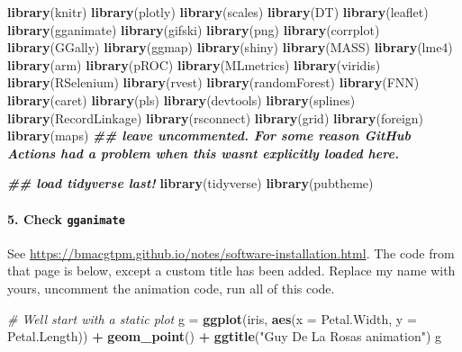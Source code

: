 \documentclass[
]{article}
\newenvironment{Shaded}{\begin{snugshade}}{\end{snugshade}}
\newcommand{\AttributeTok}[1]{\textcolor[rgb]{0.13,0.29,0.53}{#1}}
\newcommand{\CommentTok}[1]{\textcolor[rgb]{0.56,0.35,0.01}{\textit{#1}}}
\newcommand{\DocumentationTok}[1]{\textcolor[rgb]{0.56,0.35,0.01}{\textbf{\textit{#1}}}}
\newcommand{\FunctionTok}[1]{\textcolor[rgb]{0.13,0.29,0.53}{\textbf{#1}}}
\newcommand{\NormalTok}[1]{#1}
\newcommand{\OtherTok}[1]{\textcolor[rgb]{0.56,0.35,0.01}{#1}}
\newcommand{\SpecialCharTok}[1]{\textcolor[rgb]{0.81,0.36,0.00}{\textbf{#1}}}
\newcommand{\StringTok}[1]{\textcolor[rgb]{0.31,0.60,0.02}{#1}}
\begin{document}
\begin{Shaded}
\begin{Highlighting}[]
\FunctionTok{library}\NormalTok{(knitr)}
\FunctionTok{library}\NormalTok{(plotly)}
\FunctionTok{library}\NormalTok{(scales)}
\FunctionTok{library}\NormalTok{(DT)}
\FunctionTok{library}\NormalTok{(leaflet)}
\FunctionTok{library}\NormalTok{(gganimate)}
\FunctionTok{library}\NormalTok{(gifski)}
\FunctionTok{library}\NormalTok{(png)}
\FunctionTok{library}\NormalTok{(corrplot)}
\FunctionTok{library}\NormalTok{(GGally)}
\FunctionTok{library}\NormalTok{(ggmap)}
\FunctionTok{library}\NormalTok{(shiny)}
\FunctionTok{library}\NormalTok{(MASS)}
\FunctionTok{library}\NormalTok{(lme4)}
\FunctionTok{library}\NormalTok{(arm)}
\FunctionTok{library}\NormalTok{(pROC)}
\FunctionTok{library}\NormalTok{(MLmetrics)}
\FunctionTok{library}\NormalTok{(viridis)}
\FunctionTok{library}\NormalTok{(RSelenium)}
\FunctionTok{library}\NormalTok{(rvest)}
\FunctionTok{library}\NormalTok{(randomForest)}
\FunctionTok{library}\NormalTok{(FNN)}
\FunctionTok{library}\NormalTok{(caret)}
\FunctionTok{library}\NormalTok{(pls)}
\FunctionTok{library}\NormalTok{(devtools)}
\FunctionTok{library}\NormalTok{(splines)}
\FunctionTok{library}\NormalTok{(RecordLinkage)}
\FunctionTok{library}\NormalTok{(rsconnect)}
\FunctionTok{library}\NormalTok{(grid)}
\FunctionTok{library}\NormalTok{(foreign)}
\FunctionTok{library}\NormalTok{(maps) }\DocumentationTok{\#\# leave uncommented. For some reason GitHub Actions had a problem when this wasn\textquotesingle{}t explicitly loaded here. }

\DocumentationTok{\#\# load tidyverse last!}
\FunctionTok{library}\NormalTok{(tidyverse)}
\FunctionTok{library}\NormalTok{(pubtheme)}
\end{Highlighting}
\end{Shaded}

\hypertarget{check-gganimate}{%
\paragraph{\texorpdfstring{5. Check
\texttt{gganimate}}{5. Check gganimate}}\label{check-gganimate}}

See \url{https://bmacgtpm.github.io/notes/software-installation.html}.
The code from that page is below, except a custom title has been added.
Replace my name with yours, uncomment the animation code, run all of
this code.

\begin{Shaded}
\begin{Highlighting}[]
\CommentTok{\# We\textquotesingle{}ll start with a static plot}
\NormalTok{g }\OtherTok{=} \FunctionTok{ggplot}\NormalTok{(iris, }
            \FunctionTok{aes}\NormalTok{(}\AttributeTok{x =}\NormalTok{ Petal.Width, }
                \AttributeTok{y =}\NormalTok{ Petal.Length)) }\SpecialCharTok{+} 
  \FunctionTok{geom\_point}\NormalTok{() }\SpecialCharTok{+} 
  \FunctionTok{ggtitle}\NormalTok{(}\StringTok{"Guy De La Rosa\textquotesingle{}s animation"}\NormalTok{)}
\NormalTok{g}
\end{Highlighting}
\end{Shaded}
\end{document}
